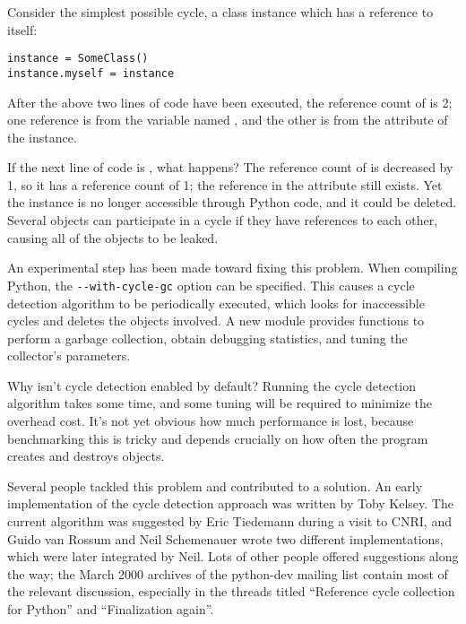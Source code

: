 \documentclass{howto}
\begin{document}
Consider the simplest possible cycle, 
a class instance which has a reference to itself:

\begin{verbatim}
instance = SomeClass()
instance.myself = instance
\end{verbatim}

After the above two lines of code have been executed, the reference
count of  is 2; one reference is from the variable
named , and the other is from the 
attribute of the instance.  

If the next line of code is , what happens?  The
reference count of  is decreased by 1, so it has a
reference count of 1; the reference in the  attribute
still exists.  Yet the instance is no longer accessible through Python
code, and it could be deleted.  Several objects can participate in a
cycle if they have references to each other, causing all of the
objects to be leaked.

An experimental step has been made toward fixing this problem.  When
compiling Python, the \verb|--with-cycle-gc| option can be specified.
This causes a cycle detection algorithm to be periodically executed,
which looks for inaccessible cycles and deletes the objects involved.
A new  module provides functions to perform a garbage
collection, obtain debugging statistics, and tuning the collector's parameters.

Why isn't cycle detection enabled by default?  Running the cycle detection
algorithm takes some time, and some tuning will be required to
minimize the overhead cost.  It's not yet obvious how much performance
is lost, because benchmarking this is tricky and depends crucially
on how often the program creates and destroys objects. 

Several people tackled this problem and contributed to a solution.  An
early implementation of the cycle detection approach was written by
Toby Kelsey.  The current algorithm was suggested by Eric Tiedemann
during a visit to CNRI, and Guido van Rossum and Neil Schemenauer
wrote two different implementations, which were later integrated by
Neil.  Lots of other people offered suggestions along the way; the
March 2000 archives of the python-dev mailing list contain most of the
relevant discussion, especially in the threads titled ``Reference
cycle collection for Python'' and ``Finalization again''.


\end{document}
